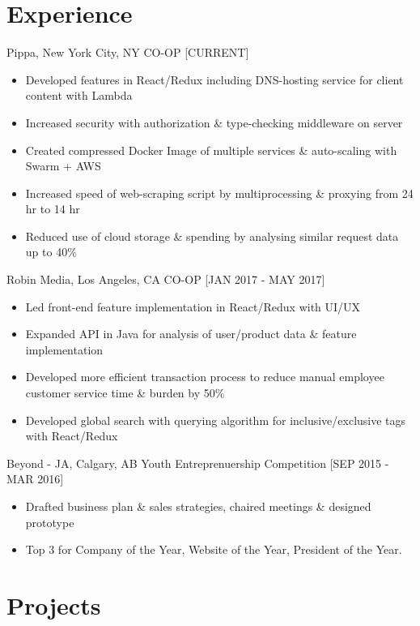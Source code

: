 \documentclass[]{friggeri-cv}
\begin{document}
\section{Experience}

\begin{entrylist}
	\entry
	{Pippa, New York City, NY}
	{CO-OP [CURRENT]}
	{
		\begin{itemize}[topsep=0pt,leftmargin=*]
			\item Developed features in React/Redux including DNS-hosting service for client content with Lambda
			\item Increased security with authorization \& type-checking middleware on server
			\item Created compressed Docker Image of multiple services \& auto-scaling with Swarm + AWS
			\item Increased speed of web-scraping script by multiprocessing \& proxying from 24 hr to 14 hr
			\item Reduced use of cloud storage \& spending by analysing similar request data up to 40\%  
		\end{itemize}
	}
	\entry
	{Robin Media, Los Angeles, CA}
	{CO-OP [JAN 2017 - MAY 2017]}
	{
		\begin{itemize}[topsep=0pt,leftmargin=*]
			\item Led front-end feature implementation in React/Redux with UI/UX
			\item Expanded API in Java for analysis of user/product data \& feature implementation
			\item Developed more efficient transaction process to reduce manual employee customer service time \& burden by 50\%
			\item Developed global search with querying algorithm for inclusive/exclusive tags with React/Redux
		\end{itemize}
	}
	\entry
	{Beyond - JA, Calgary, AB}
	{Youth Entreprenuership Competition [SEP 2015 - MAR 2016]}
	{
		\begin{itemize}[topsep=0pt,leftmargin=*]
			\item Drafted business plan \& sales strategies, chaired meetings \& designed prototype
			\item Top 3 for Company of the Year, Website of the Year, President of the Year.
	\end{itemize}}
\end{entrylist}

\section{Projects}
\end{document}
